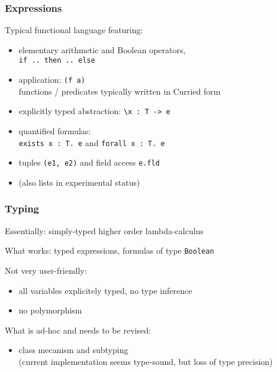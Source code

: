 \documentclass{beamer}
\begin{document}
\begin{frame}[fragile]\frametitle{Expressions}

  Typical functional language featuring:
  \begin{itemize}
  \item elementary arithmetic and Boolean operators,\\ \texttt{if .. then .. else}
  \item application: \texttt{(f a)}\\
    functions / predicates typically written in Curried form
  \item explicitly typed abstraction: \verb|\x : T -> e|
  \item quantified formulas:\\ \texttt{exists x : T. e} and \texttt{forall x : T. e}
  \item tuples \texttt{(e1, e2)} and field access \texttt{e.fld}
  \item (also lists in experimental status)
  \end{itemize}

\end{frame}

\begin{frame}[fragile]\frametitle{Typing}

  Essentially: simply-typed higher order lambda-calculus

  \vspace{3mm}
  What works: typed expressions, formulas of type \texttt{Boolean}

  \vspace{3mm}
  Not very user-friendly:
  \begin{itemize}
  \item all variables explicitely typed, no type inference 
  \item no polymorphism 
  \end{itemize}

  \vspace{3mm}
  What is ad-hoc and needs to be revised:
  \begin{itemize}
  \item class mecanism and subtyping\\
    (current implementation seems type-sound, but loss of type precision)
  \end{itemize}
\end{frame}
\end{document}
